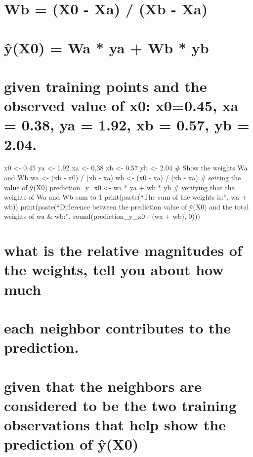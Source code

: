 \documentclass[
  letterpaper,
  DIV=11,
  numbers=noendperiod]{scrreprt}
\begin{document}
{

\chapter{Wb = (X0 - Xa) / (Xb - Xa)}\label{wb-x0---xa-xb---xa}


\chapter{ŷ(X0) = Wa * ya + Wb * yb}\label{yx0-wa-ya-wb-yb}


\chapter{given training points and the observed value of x0: x0=0.45, xa
= 0.38, ya = 1.92, xb = 0.57, yb =
2.04.}\label{given-training-points-and-the-observed-value-of-x0-x00.45-xa-0.38-ya-1.92-xb-0.57-yb-2.04.}

x0 \textless- 0.45 ya \textless- 1.92 xa \textless- 0.38 xb \textless-
0.57 yb \textless- 2.04 \# Show the weights Wa and Wb wa \textless- (xb
- x0) / (xb - xa) wb \textless- (x0 - xa) / (xb - xa) \# setting the
value of ŷ(X0) prediction\_y\_x0 \textless- wa * ya + wb * yb \#
verifying that the weights of Wa and Wb sum to 1 print(paste(``The sum
of the weights is:'', wa + wb)) print(paste(``Difference between the
prediction value of ŷ(X0) and the total weights of wa \& wb:'',
round(prediction\_y\_x0 - (wa + wb), 0)))


\chapter{what is the relative magnitudes of the weights, tell you about
how
much}\label{what-is-the-relative-magnitudes-of-the-weights-tell-you-about-how-much}


\chapter{each neighbor contributes to the
prediction.}\label{each-neighbor-contributes-to-the-prediction.}


\chapter{given that the neighbors are considered to be the two training
observations that help show the prediction of
ŷ(X0)}\label{given-that-the-neighbors-are-considered-to-be-the-two-training-observations-that-help-show-the-prediction-of-yx0}

}
\end{document}
